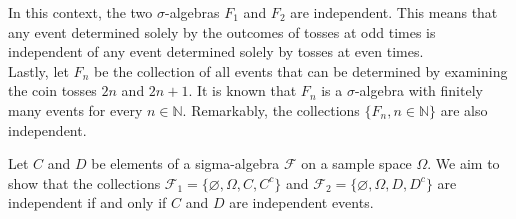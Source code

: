 In this context, the two \(\sigma\)-algebras \( F_1 \) and \( F_2 \) are independent. This means that any event determined solely by the outcomes of tosses at odd times is independent of any event determined solely by tosses at even times.\\

Lastly, let \( F_n \) be the collection of all events that can be determined by examining the coin tosses \( 2n \) and \( 2n + 1 \). It is known that \( F_n \) is a \(\sigma\)-algebra with finitely many events for every \( n \in \mathbb{N} \). Remarkably, the collections \( \{ F_n, n \in \mathbb{N} \} \) are also independent.\\

\begin{exercise}
    Let \( C \) and \( D \) be elements of a sigma-algebra \( \mathcal{F} \) on a sample space \( \Omega \). We aim to show that the collections \( \mathcal{F}_1 = \{\varnothing, \Omega, C, C^c\} \) and \( \mathcal{F}_2 = \{\varnothing, \Omega, D, D^c\} \) are independent if and only if \( C \) and \( D \) are independent events.
\end{exercise}

